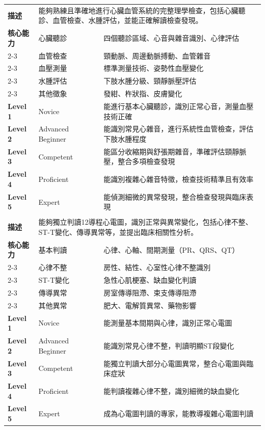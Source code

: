 \documentclass[12pt,a4paper]{article}
\begin{document}
\begin{longtable}{|p{1.5cm}|p{4cm}|p{8.5cm}|}
\rowcolor{emergency_red!10}
\multicolumn{3}{|c|}{\textbf{EPA 2: 心臟血管系統理學檢查}} \\
\hline
\textbf{描述} & \multicolumn{2}{|p{12.5cm}|}{能夠熟練且準確地進行心臟血管系統的完整理學檢查，包括心臟聽診、血管檢查、水腫評估，並能正確解讀檢查發現。} \\
\hline
\textbf{核心能力} & 心臟聽診 & 四個聽診區域、心音與雜音識別、心律評估 \\
\cline{2-3}
& 血管檢查 & 頸動脈、周邊動脈搏動、血管雜音 \\
\cline{2-3}
& 血壓測量 & 標準測量技術、姿勢性血壓變化 \\
\cline{2-3}
& 水腫評估 & 下肢水腫分級、頸靜脈壓評估 \\
\cline{2-3}
& 其他徵象 & 發紺、杵狀指、皮膚變化 \\
\hline
\textbf{Level 1} & Novice & 能進行基本心臟聽診，識別正常心音，測量血壓技術正確 \\
\hline
\textbf{Level 2} & Advanced Beginner & 能識別常見心雜音，進行系統性血管檢查，評估下肢水腫程度 \\
\hline
\textbf{Level 3} & Competent & 能區分收縮期與舒張期雜音，準確評估頸靜脈壓，整合多項檢查發現 \\
\hline
\textbf{Level 4} & Proficient & 能識別複雜心雜音特徵，檢查技術精準且有效率 \\
\hline
\textbf{Level 5} & Expert & 能偵測細微的異常發現，整合檢查發現與臨床表現 \\
\hline

\rowcolor{emergency_red!10}
\multicolumn{3}{|c|}{\textbf{EPA 3: 心電圖判讀與分析}} \\
\hline
\textbf{描述} & \multicolumn{2}{|p{12.5cm}|}{能夠獨立判讀12導程心電圖，識別正常與異常變化，包括心律不整、ST-T變化、傳導異常等，並提出臨床相關性分析。} \\
\hline
\textbf{核心能力} & 基本判讀 & 心律、心軸、間期測量（PR、QRS、QT） \\
\cline{2-3}
& 心律不整 & 房性、結性、心室性心律不整識別 \\
\cline{2-3}
& ST-T變化 & 急性心肌梗塞、缺血變化判讀 \\
\cline{2-3}
& 傳導異常 & 房室傳導阻滯、束支傳導阻滯 \\
\cline{2-3}
& 其他異常 & 肥大、電解質異常、藥物影響 \\
\hline
\textbf{Level 1} & Novice & 能測量基本間期與心律，識別正常心電圖 \\
\hline
\textbf{Level 2} & Advanced Beginner & 能識別常見心律不整，判讀明顯ST段變化 \\
\hline
\textbf{Level 3} & Competent & 能獨立判讀大部分心電圖異常，整合心電圖與臨床症狀 \\
\hline
\textbf{Level 4} & Proficient & 能判讀複雜心律不整，識別細微的缺血變化 \\
\hline
\textbf{Level 5} & Expert & 成為心電圖判讀的專家，能教導複雜心電圖判讀 \\
\hline


\end{longtable}
\end{document}
